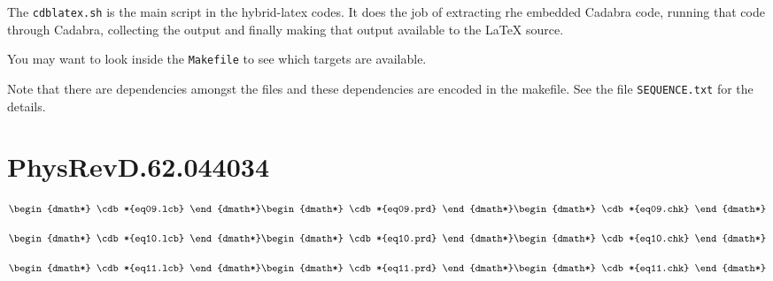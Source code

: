 \documentclass[12pt]{cdblatex}
\begin{document}
The {\tt cdblatex.sh} is the main script in the hybrid-latex codes. It does the job of
extracting rhe embedded Cadabra code, running that code through Cadabra, collecting
the output and finally making that output available to the LaTeX source.

You may want to look inside the {\tt Makefile} to see which targets are available.

Note that there are dependencies amongst the files and these dependencies are encoded
in the makefile. See the file {\tt SEQUENCE.txt} for the details.

\clearpage

\section*{PhysRevD.62.044034}


   \begin{dgroup*}
      \begin{dmath*} \cdb*{eq09.lcb} \end{dmath*}
      \begin{dmath*} \cdb*{eq09.prd} \end{dmath*}
      \begin{dmath*} \cdb*{eq09.chk} \end{dmath*}
   \end{dgroup*}


   \begin{dgroup*}
      \begin{dmath*} \cdb*{eq10.lcb} \end{dmath*}
      \begin{dmath*} \cdb*{eq10.prd} \end{dmath*}
      \begin{dmath*} \cdb*{eq10.chk} \end{dmath*}
   \end{dgroup*}


   \begin{dgroup*}
      \begin{dmath*} \cdb*{eq11.lcb} \end{dmath*}
      \begin{dmath*} \cdb*{eq11.prd} \end{dmath*}
      \begin{dmath*} \cdb*{eq11.chk} \end{dmath*}
   \end{dgroup*}
\end{document}
